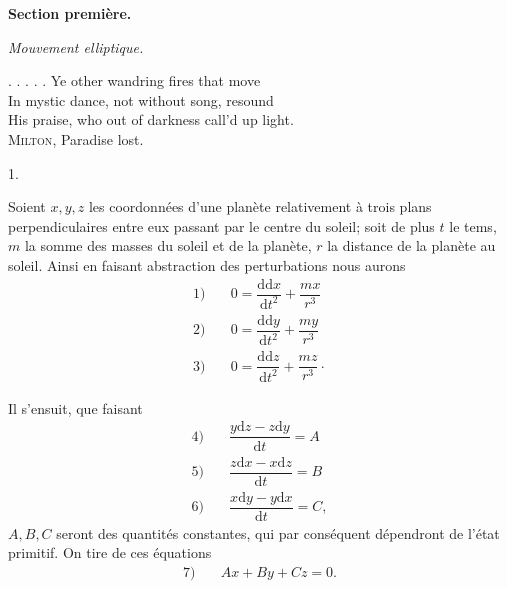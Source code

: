 \par{}\bigskip
{}
\begin{center}
{\large\bfseries Section première.\par}
\medskip\textit{Mouvement elliptique.}
\end{center}
\begin{flushright}
\begin{minipage}{.94\textwidth}
\small\raggedright
. . . . . Ye other wandring fires that move\\
In mystic dance, not without song, resound\\
His praise, who out of darkness call’d up light.\\
\hspace*{2em}\textsc{Milton}, Paradise lost.
\end{minipage}
\end{flushright}
\begin{center}1.\end{center}
\noindent\hspace*{\parindent}Soient \(x,y,z\) les coordonnées d’une planète relativement à trois plans perpendiculaires entre eux passant par le centre du soleil; soit de plus \(t\) le tems, \(m\) la somme des masses du soleil et de la planète, \(r\) la distance de la planète au soleil. Ainsi en faisant abstraction des perturbations nous aurons
\[
\begin{array}{rl}
1)\quad&0=\dfrac{\mathrm{dd}x}{\mathrm{d}t^2}+\dfrac{mx}{r^3}\\[5pt]
2)\quad&0=\dfrac{\mathrm{dd}y}{\mathrm{d}t^2}+\dfrac{my}{r^3}\\[5pt]
3)\quad&0=\dfrac{\mathrm{dd}z}{\mathrm{d}t^2}+\dfrac{mz}{r^3}\mathpunct{\cdot}
\end{array}
\]
\par Il s’ensuit, que faisant
\[
\begin{array}{rl}
4)\quad&\dfrac{y\mathrm{d}z-z\mathrm{d}y}{\mathrm{d}t}=A\\[5pt]
5)\quad&\dfrac{z\mathrm{d}x-x\mathrm{d}z}{\mathrm{d}t}=B\\[5pt]
6)\quad&\dfrac{x\mathrm{d}y-y\mathrm{d}x}{\mathrm{d}t}=C,
\end{array}
\]
\(A,B,C\) seront des quantités constantes, qui par conséquent dépendront de l’état primitif. On tire de ces équations
\[
\begin{array}{rl}7)\quad&Ax+By+Cz=0.\end{array}
\]
